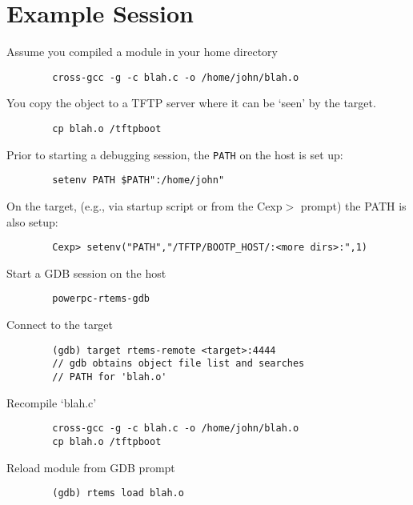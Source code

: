 \documentclass{article}
\begin{document}
\section{Example Session}
	Assume you compiled a module in your home directory
\begin{verbatim}
		cross-gcc -g -c blah.c -o /home/john/blah.o
\end{verbatim}
    You copy the object to a TFTP server where it can be
	`seen' by the target.
\begin{verbatim}
		cp blah.o /tftpboot
\end{verbatim}
	Prior to starting a debugging session, the {\tt PATH} on the
	host is set up:
\begin{verbatim}
		setenv PATH $PATH":/home/john"
\end{verbatim}
	On the target, (e.g., via startup script or from the Cexp$>$
	prompt) the PATH is also setup:
\begin{verbatim}
		Cexp> setenv("PATH","/TFTP/BOOTP_HOST/:<more dirs>:",1)
\end{verbatim}
	Start a GDB session on the host
\begin{verbatim}
		powerpc-rtems-gdb
\end{verbatim}
	Connect to the target
\begin{verbatim}
		(gdb) target rtems-remote <target>:4444
		// gdb obtains object file list and searches
        // PATH for 'blah.o'
\end{verbatim}
	Recompile `blah.c'
\begin{verbatim}
		cross-gcc -g -c blah.c -o /home/john/blah.o
		cp blah.o /tftpboot
\end{verbatim}
	Reload module from GDB prompt
\begin{verbatim}
		(gdb) rtems load blah.o
\end{verbatim}
\end{document}
